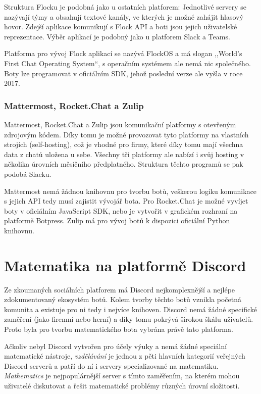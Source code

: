 \documentclass[FM]{tulthesis}
\begin{document}
	Struktura Flocku je podobná jako u ostatních platforem: Jednotlivé servery se nazývají týmy a obsahují textové kanály, ve kterých je možné zahájit hlasový hovor. Zdejší aplikace komunikují s Flock API a boti jsou jejich uživatelské reprezentace. Výběr aplikací je podobný jako u platforem Slack a Teams.
	
	Platforma pro vývoj Flock aplikací se nazývá FlockOS a má slogan ,,World's First Chat Operating System``, s operačním systémem ale nemá nic společného. Boty lze programovat v oficiálním SDK, jehož poslední verze ale vyšla v roce 2017.
	
	\subsection{Mattermost, Rocket.Chat a Zulip}
	
	Mattermost, Rocket.Chat a Zulip jsou komunikační platformy s otevřeným zdrojovým kódem. Díky tomu je možné provozovat tyto platformy na vlastních strojích (self-hosting), což je vhodné pro firmy, které díky tomu mají všechna data z chatů uložena u sebe. Všechny tři platformy ale nabízí i svůj hosting v několika úrovních měsíčního předplatného. Struktura těchto programů se pak podobá Slacku.
	
	Mattermost nemá žádnou knihovnu pro tvorbu botů, veškerou logiku komunikace s jejich API tedy musí zajistit vývojář bota. Pro Rocket.Chat je možné vyvíjet boty v oficiálním JavaScript SDK, nebo je vytvořit v grafickém rozhraní na platformě Botpress. Zulip má pro vývoj botů k dispozici oficiální Python knihovnu.
		
	\chapter{Matematika na platformě Discord}\label{Chapter3}
	
	Ze zkoumaných sociálních platforem má Discord nejkomplexnější a nejlépe zdokumentovaný ekosystém botů. Kolem tvorby těchto botů vznikla početná komunita a existuje pro ni tedy i nejvíce knihoven. Discord nemá žádné specifické zaměření (jako firemní nebo herní) a díky tomu pokrývá širokou škálu uživatelů. Proto byla pro tvorbu matematického bota vybrána právě tato platforma.
	
	Ačkoliv nebyl Discord vytvořen pro účely výuky a nemá žádné speciální matematické nástroje, \textit{vzdělávání} je jednou z pěti hlavních kategorií veřejných Discord serverů a patří do ní i servery specializované na matematiku. \textit{Mathematics} je nejpopulárnější server s tímto zaměřením, na kterém mohou uživatelé diskutovat a řešit matematické problémy různých úrovní složitosti.
	
\end{document}
